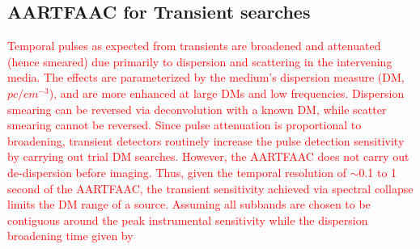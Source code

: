 \documentclass{aa}
\begin{document}
\begin{table}[tbh]

\caption{\label{tab:AARTFAAC_specs}Specifications of contemporary transient
detection instruments. The parameters are estimated at the highest
sensitivity of each instrument, viz, 60 MHz for AARTFAAC, 150 MHz
for the MWA and 74 MHz for the LWA, which observes continuously only
in its 'Narrow' mode.}
\end{table}


\subsection{\label{sub:AARTFAAC-for-Transient}AARTFAAC for Transient searches}

\textcolor{red}{Temporal pulses as expected from transients are broadened
and attenuated (hence smeared) due primarily to dispersion and scattering
in the intervening media. The effects are parameterized by the medium's
dispersion measure (DM, $pc/cm^{-3}$), and are more enhanced at large
DMs and low frequencies. Dispersion smearing can be reversed via deconvolution
with a known DM, while scatter smearing cannot be reversed. Since
pulse attenuation is proportional to broadening, transient detectors
routinely increase the pulse detection sensitivity by carrying out
trial DM searches. However, the AARTFAAC does not carry out de-dispersion
before imaging. Thus, given the temporal resolution of $\sim$0.1
to 1 second of the AARTFAAC, the transient sensitivity achieved via
spectral collapse limits the DM range of a source. Assuming all subbands
are chosen to be contiguous around the peak instrumental sensitivity
while the dispersion broadening time given by}
\end{document}
